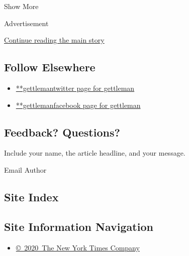 Show More

Advertisement

\protect\hyperlink{after-mid2}{Continue reading the main story}

\hypertarget{follow-elsewhere}{%
\subsection{Follow Elsewhere}\label{follow-elsewhere}}

\begin{itemize}
\tightlist
\item
  \href{https://twitter.com/gettleman}{**gettlemantwitter page for
  gettleman}
\item
  \href{https://www.facebookcorewwwi.onion/gettleman}{**gettlemanfacebook
  page for gettleman}
\end{itemize}

\hypertarget{feedback-questions}{%
\subsection{Feedback? Questions?}\label{feedback-questions}}

Include your name, the article headline, and your message.

Email Author

\hypertarget{site-index}{%
\subsection{Site Index}\label{site-index}}

\hypertarget{site-information-navigation}{%
\subsection{Site Information
Navigation}\label{site-information-navigation}}

\begin{itemize}
\tightlist
\item
  \href{https://help.nytimes3xbfgragh.onion/hc/en-us/articles/115014792127-Copyright-notice}{©~2020~The
  New York Times Company}
\end{itemize}

